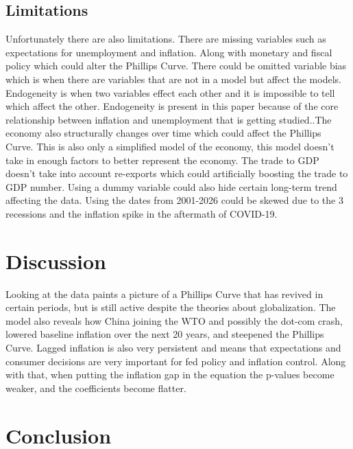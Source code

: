 \documentclass{article}
\begin{document}
\subsection{Limitations}
Unfortunately there are also limitations. There are missing variables such as expectations for unemployment and inflation. Along with monetary and fiscal policy which could alter the Phillips Curve. There could be omitted variable bias which is when there are variables that are not in a model but affect the models. Endogeneity is when two variables effect each other and it is impossible to tell which affect the other. Endogeneity is present in this paper because of the core relationship between inflation and unemployment that is getting studied..The economy also structurally changes over time which could affect the Phillips Curve. This is also only a simplified model of the economy, this model doesn't take in enough factors to better represent the economy. The trade to GDP doesn't take into account re-exports which could artificially boosting the trade to GDP number. Using a dummy variable could also hide certain long-term trend affecting the data. Using the dates from 2001-2026 could be skewed due to the 3 recessions and the inflation spike in the aftermath of COVID-19.

\section{Discussion}

Looking at the data paints a picture of a Phillips Curve that has revived in certain periods, but is still active despite the theories about globalization. The model also reveals how China joining the WTO and possibly the dot-com crash, lowered baseline inflation over the next 20 years, and steepened the Phillips Curve. Lagged inflation is also very persistent and means that expectations and consumer decisions are very important for fed policy and inflation control. Along with that, when putting the inflation gap in the equation the p-values become weaker, and the coefficients become flatter.

\section{Conclusion}
\end{document}
